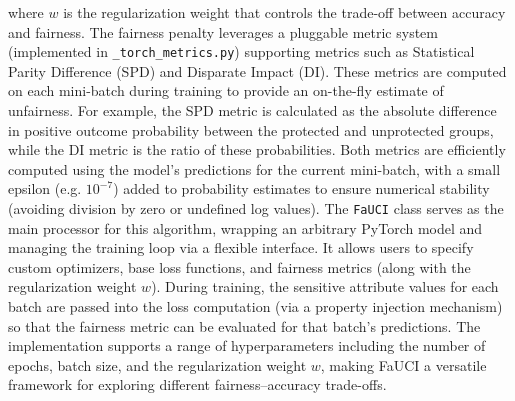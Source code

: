 \documentclass[12pt,a4paper,openright,twoside]{book}
\begin{document}
where $w$ is the regularization weight that controls the trade-off between accuracy and fairness. The fairness penalty leverages a pluggable metric system (implemented in \texttt{\_torch\_metrics.py}) supporting metrics such as Statistical Parity Difference (SPD) and Disparate Impact (DI). These metrics are computed on each mini-batch during training to provide an on-the-fly estimate of unfairness. For example, the SPD metric is calculated as the absolute difference in positive outcome probability between the protected and unprotected groups, while the DI metric is the ratio of these probabilities. Both metrics are efficiently computed using the model’s predictions for the current mini-batch, with a small epsilon (e.g. $10^{-7}$) added to probability estimates to ensure numerical stability (avoiding division by zero or undefined log values). The \texttt{FaUCI} class serves as the main processor for this algorithm, wrapping an arbitrary PyTorch model and managing the training loop via a flexible interface. It allows users to specify custom optimizers, base loss functions, and fairness metrics (along with the regularization weight $w$). During training, the sensitive attribute values for each batch are passed into the loss computation (via a property injection mechanism) so that the fairness metric can be evaluated for that batch’s predictions. The implementation supports a range of hyperparameters including the number of epochs, batch size, and the regularization weight $w$, making FaUCI a versatile framework for exploring different fairness–accuracy trade-offs.
\end{document}
